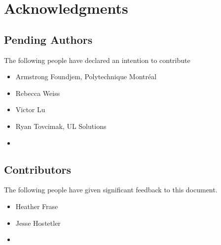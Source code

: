 \documentclass{article}
\begin{document}
\section{Acknowledgments}
\subsection{Pending Authors}
The following people have declared an intention to contribute
\begin{itemize}
\item Armstrong Foundjem, Polytechnique Montréal 
\item Rebecca Weiss
\item Victor Lu
\item Ryan Tovcimak, UL Solutions
\item <Your name here>
\end{itemize}
\subsection{Contributors}
The following people have given significant feedback to this document.
\begin{itemize}
\item Heather Frase
\item Jesse Hostetler
\item <Your name here>
\end{itemize}

\appendix 




\end{document}
